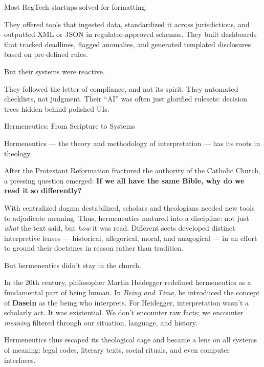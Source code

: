 Most RegTech startups solved for formatting.

They offered tools that ingested data, standardized it across jurisdictions, and outputted XML or JSON 
in regulator-approved schemas. They built dashboards that tracked deadlines, flagged anomalies, and 
generated templated disclosures based on pre-defined rules.

But their systems were reactive.

They followed the letter of compliance, and not its spirit. They automated checklists, not judgment. Their 
“AI” was often just glorified rulesets: decision trees hidden behind polished UIs.

\medskip

\begin{PhilosophicalSidebar}{Hermeneutics: From Scripture to Systems}

    Hermeneutics — the theory and methodology of interpretation — has its roots in theology.
    
    \medskip
    
    After the Protestant Reformation fractured the authority of the Catholic Church, a pressing question emerged:  
    \textbf{If we all have the same Bible, why do we read it so differently?}
    
    \medskip
    
    With centralized dogma destabilized, scholars and theologians needed new tools to adjudicate meaning. Thus, 
    hermeneutics matured into a discipline: not just \textit{what} the text said, but \textit{how} it was read.  
    Different sects developed distinct interpretive lenses — historical, allegorical, moral, and anagogical — 
    in an effort to ground their doctrines in reason rather than tradition.
    
    \medskip
    
    But hermeneutics didn’t stay in the church.
    
    \medskip
    
    In the 20th century, philosopher Martin Heidegger redefined hermeneutics as a fundamental part of being human. 
    In \textit{Being and Time}, he introduced the concept of \textbf{Dasein} as the being who interprets.  
    For Heidegger, interpretation wasn’t a scholarly act. It was existential.  
    We don’t encounter raw facts; we encounter \textit{meaning} filtered through our situation, language, and history.
    
    \medskip
    
    Hermeneutics thus escaped its theological cage and became a lens on all systems of meaning:  
    legal codes, literary texts, social rituals, and even computer interfaces.
    

\end{PhilosophicalSidebar}
